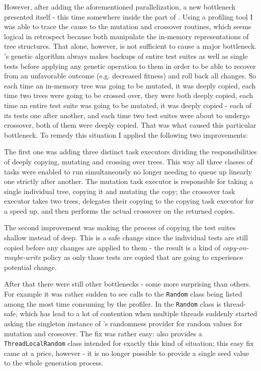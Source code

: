 However, after adding the aforementioned parallelization, a new bottleneck presented itself - this time 
somewhere inside the \java part of \xmlmate. Using a \java profiling tool I was able to trace the cause 
to the mutation and crossover routines, which seems logical in retrospect because both manipulate the 
in-memory representations of \xml tree structures. That alone, however, is not sufficient to cause a 
major bottleneck. \evosuite's genetic algorithm always makes backups of entire test suites as well as 
single tests before applying any genetic operation to them in order to be able to recover from an 
unfavorable outcome (e.g. decreased fitness) and roll back all changes. So each time an in-memory \xml 
tree was going to be mutated, it was deeply copied, each time two \xml trees were going to be crossed 
over, they were both deeply copied, each time an entire test suite was going to be mutated, it was 
deeply copied - each of its tests one after another, and each time two test suites were about to 
undergo crossover, both of them were deeply copied. That was what caused this particular bottleneck. 
To remedy this situation I applied the following two improvements:

The first one was adding three distinct task executors dividing the responsibilities of deeply copying, mutating and 
crossing over \xml trees. This way all three classes of tasks were enabled to run simultaneously 
no longer needing to queue up linearly one strictly after another. The mutation task executor is 
responsible for taking a single individual \xml tree, copying it and mutating the copy; the 
crossover task executor takes two \xml trees, delegates their copying to the copying task executor 
for a speed up, and then performs the actual crossover on the returned copies.

The second improvement was making the process of copying the test suites shallow instead of deep. 
This is a safe change since the individual tests are still copied before any changes are applied 
to them - the result is a kind of \emph{copy-on-maybe-write} policy as only those tests are copied 
that are going to experience potential change.

After that there were still other bottlenecks - some more surprising than others. For example 
it was rather sudden to see calls to the \texttt{Random} class being listed among the most time consuming 
by the profiler. In  the \texttt{Random} class is thread-safe, which has lead to a lot of 
contention when multiple threads suddenly started asking the singleton instance of \evosuite's randomness 
provider for random values for mutation and crossover. The fix was rather easy:  also provides 
a \texttt{ThreadLocalRandom} class intended for exactly this kind of situation; this easy fix came 
at a price, however - it is no longer possible to provide a single seed value to the whole generation 
process.

